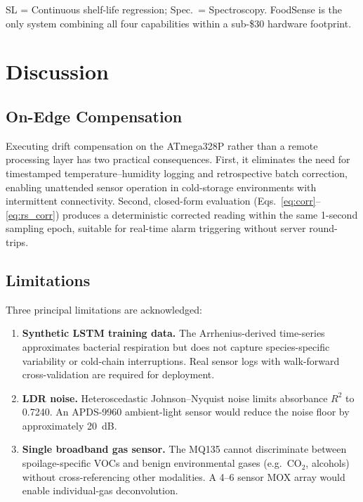 \documentclass[conference]{IEEEtran}
\begin{document}
\noindent SL = Continuous shelf-life regression; Spec.\ = Spectroscopy.
FoodSense is the only system combining all four capabilities within a
sub-\$30 hardware footprint.

\section{Discussion}
\label{sec:discussion}

\subsection{On-Edge Compensation}

Executing drift compensation on the ATmega328P rather than a remote
processing layer has two practical consequences. First, it eliminates
the need for timestamped temperature--humidity logging and retrospective
batch correction, enabling unattended sensor operation in cold-storage
environments with intermittent connectivity. Second, closed-form
evaluation (Eqs.~\ref{eq:corr}--\ref{eq:rs_corr}) produces a
deterministic corrected reading within the same 1-second sampling epoch,
suitable for real-time alarm triggering without server round-trips.

\subsection{Limitations}

Three principal limitations are acknowledged:
\begin{enumerate}
  \item \textbf{Synthetic LSTM training data.} The Arrhenius-derived
        time-series approximates bacterial respiration but does not capture
        species-specific variability or cold-chain interruptions. Real
        sensor logs with walk-forward cross-validation are required for
        deployment.
  \item \textbf{LDR noise.} Heteroscedastic Johnson--Nyquist noise limits
        absorbance $R^2$ to 0.7240. An APDS-9960 ambient-light sensor
        would reduce the noise floor by approximately 20~dB.
  \item \textbf{Single broadband gas sensor.} The MQ135 cannot discriminate
        between spoilage-specific VOCs and benign environmental gases
        (e.g.\ CO$_2$, alcohols) without cross-referencing other modalities.
        A 4--6 sensor MOX array would enable individual-gas deconvolution.
\end{enumerate}
\end{document}
